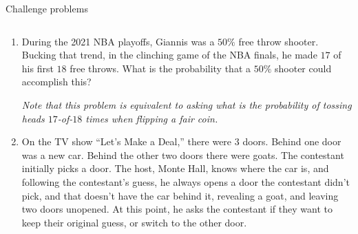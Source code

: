 \documentclass[9pt,aspectratio=169]{beamer}
\begin{document}
\begin{frame}{Challenge problems}
  \begin{columns}[T]
    \begin{column}{0.5\textwidth}
      {\small
      \begin{enumerate}
        \item During the 2021 NBA playoffs, Giannis was a $50\%$ free throw shooter.  Bucking that trend, in the clinching game of the NBA finals, he made $17$ of his first $18$ free throws.  What is the probability that a $50\%$ shooter could accomplish this?  
        
        \emph{Note that this problem is equivalent to asking what is the probability of tossing heads $17$-of-$18$ times when flipping a fair coin.}
        \item On the TV show “Let’s Make a Deal,” there were $3$ doors.  Behind one door was a new car.  Behind the other two doors there were goats.  The contestant initially picks a door.  The host, Monte Hall, knows where the car is, and following the contestant’s guess, he always opens a door the contestant didn’t pick, and that doesn’t have the car behind it, revealing a goat, and leaving two doors unopened.  At this point, he asks the contestant if they want to keep their original guess, or switch to the other door. 
        

\end{enumerate}}
\end{column}
\end{columns}
\end{frame}
\end{document}
